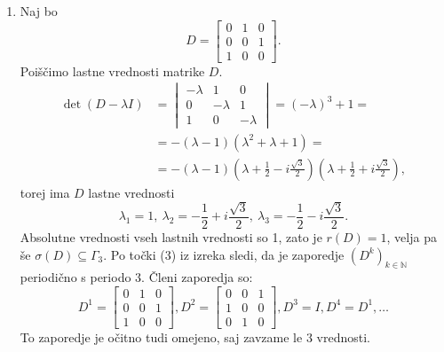 \documentclass[mat1]{fmfdelo}
\newcommand{\N}{\mathbb N}
\begin{document}
\begin{zgled}
\begin{enumerate}
        \item Naj bo
        \begin{equation*}
            D =
            \begin{bmatrix}
                0 & 1 & 0 \\
                0 & 0 & 1 \\
                1 & 0 & 0
            \end{bmatrix}.
        \end{equation*}
        Poiščimo lastne vrednosti matrike $D$.
        \begin{align*}
            \det (D - \lambda I) &=
            \begin{vmatrix}
                -\lambda & 1 & 0 \\
                0 & -\lambda & 1 \\
                1 & 0 & -\lambda
            \end{vmatrix}
            = (-\lambda)^3 + 1 = \\
            &= -(\lambda - 1)(\lambda^2+\lambda+1) = \\
            &= -(\lambda - 1)\left(\lambda + \frac{1}{2} - i\frac{\sqrt{3}}{2}\right)\left(\lambda + \frac{1}{2} + i\frac{\sqrt{3}}{2}\right),
        \end{align*}
        torej ima $D$ lastne vrednosti \[\lambda_1=1,\ \lambda_2 = - \frac{1}{2} + i\frac{\sqrt{3}}{2},\ \lambda_3 = - \frac{1}{2} - i\frac{\sqrt{3}}{2}.\] Absolutne vrednosti vseh lastnih vrednosti so 1, zato je $r(D) = 1$, velja pa še $\sigma(D) \subseteq \Gamma_3$. Po točki (3) iz izreka sledi, da je zaporedje $(D^k)_{k\in\N}$ periodično s periodo $3$. Členi zaporedja so:
        \begin{equation*}
            D^1 =
            \begin{bmatrix}
                0 & 1 & 0 \\
                0 & 0 & 1 \\
                1 & 0 & 0
            \end{bmatrix},
            D^2 = 
            \begin{bmatrix}
                0 & 0 & 1 \\
                1 & 0 & 0 \\
                0 & 1 & 0
            \end{bmatrix},
            D^3 = I, D^4 = D^1, \ldots
        \end{equation*}
        To zaporedje je očitno tudi omejeno, saj zavzame le $3$ vrednosti. \qedhere
    \end{enumerate}
\end{zgled}
\end{document}
